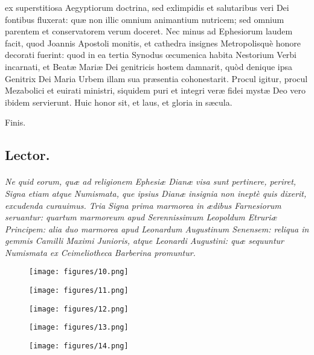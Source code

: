 \documentclass[a4paper, 11pt, oneside, polutonikogreek, latin]{article}
\begin{document}
ex superstitiosa Aegyptiorum doctrina, sed exlimpidis et salutaribus veri Dei fontibus fluxerat: quæ non illic omnium animantium nutricem; sed omnium parentem et conservatorem verum doceret. Nec minus ad Ephesiorum laudem facit, quod Joannis Apostoli monitis, et cathedra insignes Metropolisquè honore decorati fuerint: quod in ea tertia Synodus œcumenica habita Nestorium Verbi incarnati, et Beatæ Mariæ Dei genitricis hostem damnarit, quòd denique ipsa Genitrix Dei Maria Urbem illam sua præsentia cohonestarit. Procul igitur, procul Mezabolici et euirati ministri, siquidem puri et integri veræ fidei mystæ Deo vero ibidem servierunt. Huic honor sit, et laus, et gloria in sæcula.

Finis.
\clearpage
\subsection{Lector.}
\paragraph{}
\emph{Ne quid eorum, quæ ad religionem Ephesiæ Dianæ visa sunt pertinere, periret, Signa etiam atque Numismata, que ipsius Dianæ insignia non ineptè quis dixerit, excudenda curauimus. Tria Signa prima marmorea in ædibus Farnesiorum seruantur: quartum marmoreum apud Serennissimum Leopoldum Etruriæ Principem: alia duo marmorea apud Leonardum Augustinum Senensem: reliqua in gemmis Camilli Maximi Junioris, atque Leonardi Augustini: quæ sequuntur Numismata ex Ceimeliotheca Barberina promuntur.}
\clearpage
\vspace*{\fill}
\begin{figure}[H]
\centering
\texttt{[image: figures/10.png]}
\end{figure}
\vspace*{\fill}
\clearpage
\vspace*{\fill}
\begin{figure}[H]
\centering
\texttt{[image: figures/11.png]}
\end{figure}
\vspace*{\fill}
\clearpage
\vspace*{\fill}
\begin{figure}[H]
\centering
\texttt{[image: figures/12.png]}
\end{figure}
\vspace*{\fill}
\clearpage
\vspace*{\fill}
\begin{figure}[H]
\centering
\texttt{[image: figures/13.png]}
\end{figure}
\vspace*{\fill}
\clearpage
\vspace*{\fill}
\begin{figure}[H]
\centering
\texttt{[image: figures/14.png]}
\end{figure}
\vspace*{\fill}
\clearpage
\end{document}
